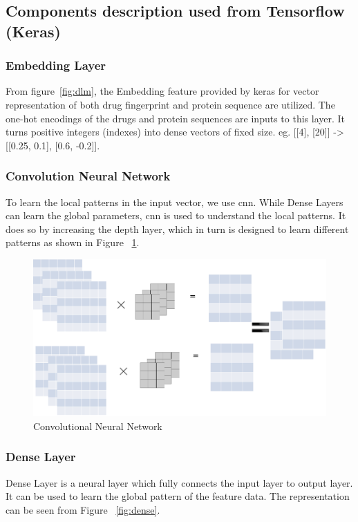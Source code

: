   \subsection{Components description used from Tensorflow (Keras)}
  \subsubsection{Embedding Layer}
  From figure~\ref{fig:dlm}, the Embedding feature provided by keras for vector representation of both drug fingerprint and protein sequence are utilized. The one-hot encodings of the drugs and protein sequences are inputs to this layer. It turns positive integers (indexes) into dense vectors of fixed size. eg. [[4], [20]] -> [[0.25, 0.1], [0.6, -0.2]].

  \subsubsection{Convolution Neural Network}
  To learn the local patterns in the input vector, we use \acrshort{cnn}. While Dense Layers can learn the global parameters, \acrshort{cnn} is used to understand the local patterns. It does so by increasing the depth layer, which in turn is designed to learn different patterns as shown in Figure ~\ref{fig:cnn}.
  \begin{figure}[H]
    \centering
    \includegraphics[width=.8\linewidth]{mainmatter/3-Methodology/images/cnn.png}
    \caption{Convolutional Neural Network}
    \label{fig:cnn}
  \end{figure}
  
  \subsubsection{Dense Layer}
  Dense Layer is a neural layer which fully connects the input layer to output layer. It can be used to learn the global pattern of the feature data. The representation can be seen from Figure ~\ref{fig:dense}.
  
  
